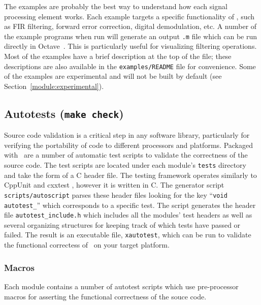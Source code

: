 The examples are probably the best way to understand how each signal
processing element works.
Each example targets a specific functionality of \liquid,
such as FIR filtering, forward error correction, digital demodulation,
etc.
A number of the example programs when run will generate an output
{\tt .m} file which can be run directly in Octave~\cite{octave:web}.
This is particularly useful for visualizing filtering operations.
Most of the examples have a brief description at the top of the file;
these descriptions are also available in the {\tt examples/README} file
for convenience.
Some of the examples are experimental and will not be built by default
(see Section~\ref{module:experimental}).

\subsection{Autotests ({\tt make check})}
\label{section:installation:targets:autotests}
Source code validation is a critical step in any software library,
particularly for verifying the portability of code to different processors and
platforms.
Packaged with \liquid\ are a number of automatic test scripts to validate the
correctness of the source code.
The test scripts are located under each module's {\tt tests} directory and
take the form of a C header file.
The testing framework operates similarly to CppUnit \cite{cppunit:web} and
cxxtest \cite{cxxtest:web}, however it is written in C.
The generator script {\tt scripts/autoscript} parses these header files looking for
the key ``{\tt void autotest\_}'' which corresponds to a specific test.
The script generates the header file {\tt autotest\_include.h} which
includes all the modules' test headers as well as several organizing
structures for keeping track of which tests have passed or failed.
The result is an executable file, {\tt xautotest}, which can be run to
validate the functional correctess of \liquid\ on your target platform.

\subsubsection{Macros}
Each module contains a number of autotest scripts which use pre-processor
macros for asserting the functional correctness of the souce code.

